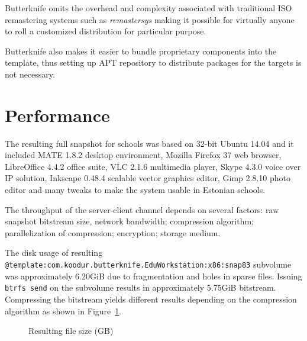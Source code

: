 \documentclass[a4paper,11pt]{kth-mag}
\begin{document}
Butterknife omits the overhead
and complexity associated with traditional
ISO remastering systems such as \emph{remastersys}
\cite{livecd-customization}
making it possible for virtually anyone
to roll a customized distribution
for particular purpose.

Butterknife also makes it easier to
bundle proprietary components
into the template, thus setting up APT repository to distribute
packages for the targets is not necessary.


\section{Performance}

The resulting full snapshot for schools was based on 32-bit Ubuntu 14.04 and
it included MATE 1.8.2 desktop environment, Mozilla Firefox 37 web browser,
LibreOffice 4.4.2 office suite,
VLC 2.1.6 multimedia player,
Skype 4.3.0 voice over IP solution,
Inkscape 0.48.4 scalable vector graphics editor,
Gimp 2.8.10 photo editor and many tweaks
to make the system usable in Estonian schools.

The throughput of the server-client channel depends on
several factors:
raw snapshot bitstream size,
network bandwidth;
compression algorithm;
parallelization of compression;
encryption;
storage medium.

The disk usage of resulting
\lstinline{@template:com.koodur.butterknife.EduWorkstation:x86:snap83}
subvolume was approximately 6.20GiB
due to fragmentation and holes in sparse files.
Issuing \lstinline{btrfs send} on the subvolume
results in approximately 5.75GiB bitstream.
Compressing the bitstream yields different
results depending on the compression algorithm as
shown in Figure~\ref{chart:resulting-file-size}.

\begin{figure}
\caption{Resulting file size (GB)}
\label{chart:resulting-file-size}
\end{figure}
\end{document}

